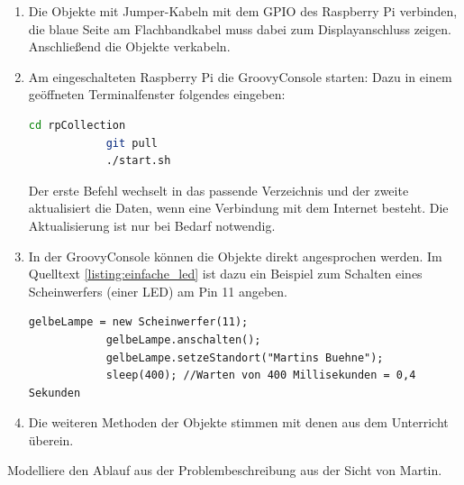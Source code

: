 \documentclass[11pt, a4paper]{scrartcl}
\begin{document}
\begin{enumerate}

	\item Die Objekte mit Jumper-Kabeln mit dem GPIO des Raspberry Pi verbinden, die blaue Seite am Flachbandkabel muss dabei zum Displayanschluss zeigen. Anschließend die Objekte verkabeln.

	\item Am eingeschalteten Raspberry Pi die GroovyConsole starten: Dazu in einem geöffneten Terminalfenster folgendes eingeben:
		\begin{lstlisting}[gobble=6,language=Bash]
			cd rpCollection
			git pull
			./start.sh
		\end{lstlisting}

	Der erste Befehl wechselt in das passende Verzeichnis und der zweite aktualisiert die Daten, wenn eine Verbindung mit dem Internet besteht. Die Aktualisierung ist nur bei Bedarf notwendig.

	\item In der GroovyConsole können die Objekte direkt angesprochen werden. Im Quelltext \ref{listing:einfache_led} ist dazu ein Beispiel zum Schalten eines Scheinwerfers (einer LED) am Pin 11 angeben. 

		\begin{lstlisting}[caption={Steuerung eines Scheinwerfers.},label={listing:einfache_led}, gobble=6]
			gelbeLampe = new Scheinwerfer(11);
			gelbeLampe.anschalten();
			gelbeLampe.setzeStandort("Martins Buehne");
			sleep(400); //Warten von 400 Millisekunden = 0,4 Sekunden
		\end{lstlisting}

	\item Die weiteren Methoden der Objekte stimmen mit denen aus dem Unterricht überein.

\end{enumerate}

\begin{aufgabe}
	Modelliere den Ablauf aus der Problembeschreibung aus der Sicht von Martin.
\end{aufgabe}
\end{document}
